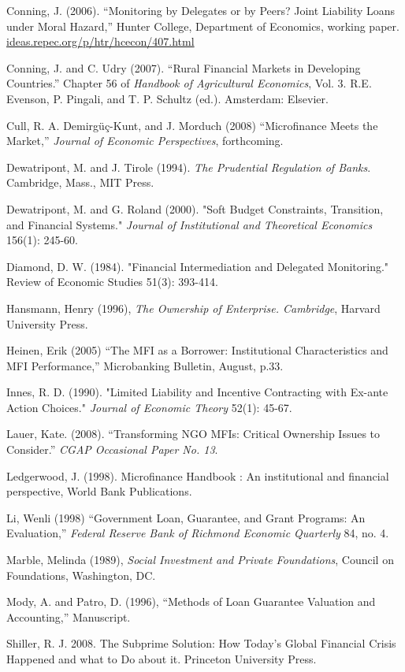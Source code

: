 \documentclass[
]{article}
\begin{document}
Conning, J. (2006). ``Monitoring by Delegates or by Peers? Joint
Liability Loans under Moral Hazard,'' Hunter College, Department of
Economics, working paper.
\href{http://ideas.repec.org/p/htr/hcecon/407.html}{ideas.repec.org/p/htr/hcecon/407.html}

Conning, J. and C. Udry (2007). ``Rural Financial Markets in Developing
Countries.'' Chapter 56 of \emph{Handbook of Agricultural Economics},
Vol. 3. R.E. Evenson, P. Pingali, and T. P. Schultz (ed.). Amsterdam:
Elsevier.

Cull, R. A. Demirgüç-Kunt, and J. Morduch (2008) ``Microfinance Meets
the Market,'' \emph{Journal of Economic Perspectives}, forthcoming.

Dewatripont, M. and J. Tirole (1994). \emph{The Prudential Regulation of
Banks}. Cambridge, Mass., MIT Press.

Dewatripont, M. and G. Roland (2000). "Soft Budget Constraints,
Transition, and Financial Systems." \emph{Journal of Institutional and
Theoretical Economics} 156(1): 245-60.

Diamond, D. W. (1984). "Financial Intermediation and Delegated
Monitoring." Review of Economic Studies 51(3): 393-414.

Hansmann, Henry (1996), \emph{The Ownership of Enterprise. Cambridge},
Harvard University Press.

Heinen, Erik (2005) ``The MFI as a Borrower: Institutional
Characteristics and MFI Performance,'' Microbanking Bulletin, August,
p.33.

Innes, R. D. (1990). "Limited Liability and Incentive Contracting with
Ex-ante Action Choices." \emph{Journal of Economic Theory} 52(1): 45-67.

Lauer, Kate. (2008). ``Transforming NGO MFIs: Critical Ownership Issues
to Consider.'' \emph{CGAP Occasional Paper No. 13}.

Ledgerwood, J. (1998). Microfinance Handbook : An institutional and
financial perspective, World Bank Publications.

Li, Wenli (1998) ``Government Loan, Guarantee, and Grant Programs: An
Evaluation,'' \emph{Federal Reserve Bank of Richmond Economic Quarterly}
84, no. 4.

Marble, Melinda (1989), \emph{Social Investment and Private
Foundations}, Council on Foundations, Washington, DC.

Mody, A. and Patro, D. (1996), ``Methods of Loan Guarantee Valuation and
Accounting,'' Manuscript.

Shiller, R. J. 2008. The Subprime Solution: How Today's Global Financial
Crisis Happened and what to Do about it. Princeton University Press.
\end{document}
